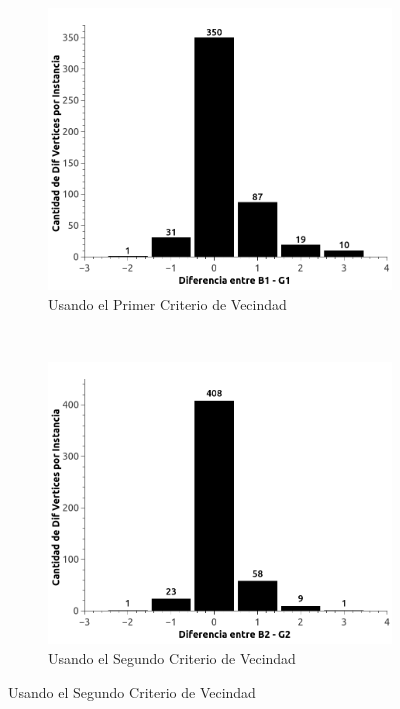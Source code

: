 \begin{itemize}
\begin{figure}[H]
        \centering
        \begin{subfigure}[b]{0.5\textwidth}
                \includegraphics[width=\textwidth]{imagenes/ejer4-B1vsG1.jpg}
                \caption{Usando el Primer Criterio de Vecindad}
        \end{subfigure}%
        ~ %
        \begin{subfigure}[b]{0.5\textwidth}
                \includegraphics[width=\textwidth]{imagenes/ejer4-B2vsG2.jpg}
                \caption{Usando el Segundo Criterio de Vecindad}
        \end{subfigure}

\end{figure}

\end{itemize}

